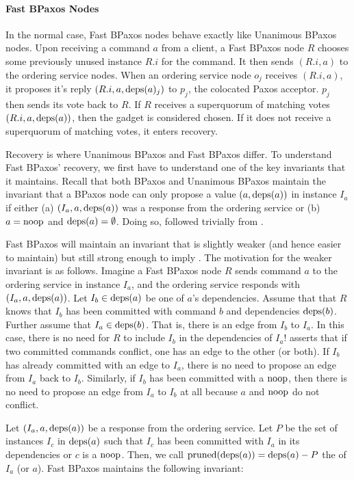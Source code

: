 \paragraph{Fast BPaxos Nodes}
In the normal case, Fast BPaxos nodes behave exactly like Unanimous BPaxos
nodes. Upon receiving a command $a$ from a client, a Fast BPaxos node $R$
chooses some previously unused instance $R.i$ for the command. It then sends
$(R.i, a)$ to the ordering service nodes.
%
When an ordering service node $o_j$ receives $(R.i, a)$, it proposes it's reply
$(R.i, a, \text{deps}(a)_j)$ to $p_j$, the colocated Paxos acceptor. $p_j$ then sends
its vote back to $R$.
%
If $R$ receives a superquorum of matching votes $(R.i, a, \text{deps}(a))$, then the
gadget is considered chosen. If it does not receive a superquorum of matching
votes, it enters recovery.

Recovery is where Unanimous BPaxos and Fast BPaxos differ. To understand Fast
BPaxos' recovery, we first have to understand one of the key invariants that it
maintains. Recall that both BPaxos and Unanimous BPaxos maintain the invariant
that a BPaxos node can only propose a value $(a, \text{deps}(a))$ in instance $I_a$
if either (a) $(I_a, a, \text{deps}(a))$ was a response from the ordering service or
(b) $a = \text{noop}$ and $\text{deps}(a) = \emptyset$. Doing so,
 followed trivially from .

Fast BPaxos will maintain an invariant that is slightly weaker (and hence
easier to maintain) but still strong enough to imply
. The motivation for the weaker invariant is as
follows. Imagine a Fast BPaxos node $R$ sends command $a$ to the ordering
service in instance $I_a$, and the ordering service responds with $(I_a, a,
\text{deps}(a))$. Let $I_b \in \text{deps}(a)$ be one of $a$'s dependencies. Assume that
that $R$ knows that $I_b$ has been committed with command $b$ and dependencies
$\text{deps}(b)$. Further assume that $I_a \in \text{deps}(b)$. That is, there is an edge
from $I_b$ to $I_a$. In this case, there is no need for $R$ to include $I_b$ in
the dependencies of $I_a$!  asserts that if two
committed commands conflict, one has an edge to the other (or both). If $I_b$
has already committed with an edge to $I_a$, there is no need to propose an
edge from $I_a$ back to $I_b$.
%
Similarly, if $I_b$ has been committed with a $\text{noop}$, then there is no need to
propose an edge from $I_a$ to $I_b$ at all because $a$ and $\text{noop}$ do not
conflict.

\newcommand{\pruned}{\text{pruned}}
Let $(I_a, a, \text{deps}(a))$ be a response from the ordering service. Let $P$ be
the set of instances $I_c$ in $\text{deps}(a)$ such that $I_c$ has been committed
with $I_a$ in its dependencies or $c$ is a $\text{noop}$. Then, we call
$\pruned(\deps{a}) = \deps{a} - P$ the  of $I_a$
(or $a$). Fast BPaxos maintains the following invariant:

